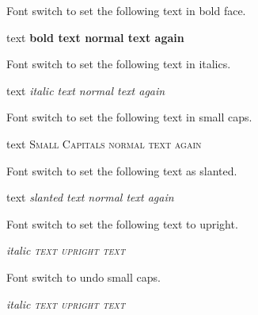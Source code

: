 \documentclass{article}
\begin{document}
\begin{docCommands}[
doc no index, %
doc name = bfseries,
doc description=font,
] {}
Font switch to set the following text in bold face.
\begin{dispExample}
  text \bfseries bold text \mdseries normal text again
\end{dispExample}
\end{docCommands}

\begin{docCommands}[
doc no index, %
doc name = itshape,
doc description=font,
] {}
Font switch to set the following text in italics.
\begin{dispExample}
  text \itshape italic text \upshape normal text again
\end{dispExample}
\end{docCommands}

\begin{docCommands}[
doc no index, %
doc name = scshape,
doc description=font,
] {}
Font switch to set the following text in small caps.
\begin{dispExample}
  text \scshape Small Capitals \upshape normal text again
\end{dispExample}
\end{docCommands}


\begin{docCommands}[
doc no index, %
doc name = slshape,
doc description=font,
] {}
Font switch to set the following text as slanted.
\begin{dispExample}
  \sffamily text \slshape slanted text \upshape normal text again
\end{dispExample}
\end{docCommands}


\begin{docCommands}[
doc no index, %
doc name = upshape,
doc description=font,
] {}
Font switch to set the following text to upright.%
\begin{dispExample}
    \itshape italic \scshape text \upshape upright text 
\end{dispExample}
\end{docCommands}

\begin{docCommands}[
doc no index, %
doc name = ulcshape,
doc description=font,
] {}
Font switch to undo small caps.%
\begin{dispExample}
    \itshape italic \scshape text \upshape upright \ulcshape text 
\end{dispExample}
\end{docCommands}
\end{document}
